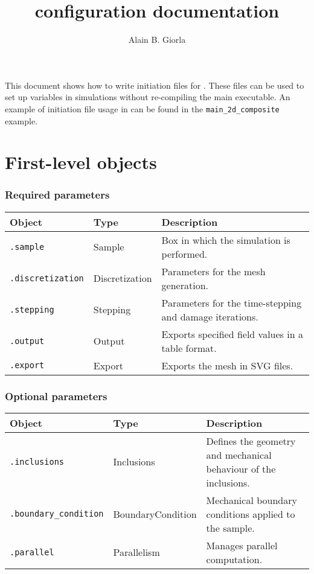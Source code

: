 \documentclass[10pt]{article}
\begin{document}
\title{\amie configuration documentation}
\author{Alain B. Giorla}

\maketitle

This document shows how to write initiation files for \amie. These files can be used to set up variables in simulations without re-compiling the main executable. An example of initiation file usage in \amie can be found in the \verb+main_2d_composite+ example.

\tableofcontents

\section{First-level objects}

\subsubsection*{Required parameters}

\begin{tabularx}{\textwidth}{llX}
\hline 
Object & Type & Description \\ 
\hline 
\verb+.sample+ & Sample & Box in which the simulation is performed. \\ 
\verb+.discretization+ & Discretization & Parameters for the mesh generation. \\ 
\verb+.stepping+ & Stepping & Parameters for the time-stepping and damage iterations. \\ 
\verb+.output+ & Output & Exports specified field values in a table format. \\ 
\verb+.export+ & Export & Exports the mesh in SVG files. \\ 
\hline 
\end{tabularx}

\subsubsection*{Optional parameters}

\begin{tabularx}{\textwidth}{llX}
\hline 
Object & Type & Description \\ 
\hline 
\verb+.inclusions+ & Inclusions & Defines the geometry and mechanical behaviour of the inclusions. \\ 
\verb+.boundary_condition+ & BoundaryCondition & Mechanical boundary conditions applied to the sample. \\ 
\verb+.parallel+ & Parallelism & Manages parallel computation. \\
\hline 
\end{tabularx} 
\end{document}
